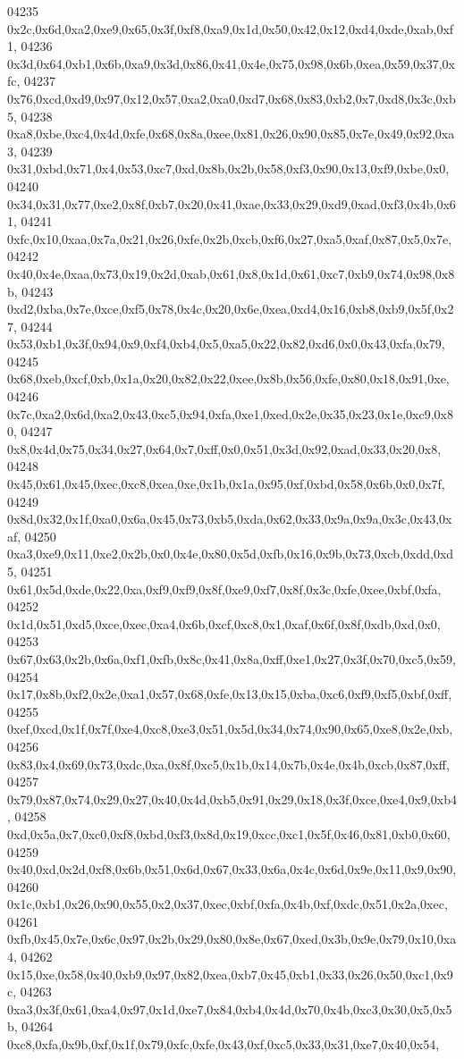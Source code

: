 \begin{DoxyCode}
04235   0x2c,0x6d,0xa2,0xe9,0x65,0x3f,0xf8,0xa9,0x1d,0x50,0x42,0x12,0xd4,0xde,0xab,0xf1,
04236   0x3d,0x64,0xb1,0x6b,0xa9,0x3d,0x86,0x41,0x4e,0x75,0x98,0x6b,0xea,0x59,0x37,0xfc,
04237   0x76,0xcd,0xd9,0x97,0x12,0x57,0xa2,0xa0,0xd7,0x68,0x83,0xb2,0x7,0xd8,0x3c,0xb5,
04238   0xa8,0xbe,0xc4,0x4d,0xfe,0x68,0x8a,0xee,0x81,0x26,0x90,0x85,0x7e,0x49,0x92,0xa3,
04239   0x31,0xbd,0x71,0x4,0x53,0xc7,0xd,0x8b,0x2b,0x58,0xf3,0x90,0x13,0xf9,0xbe,0x0,
04240   0x34,0x31,0x77,0xe2,0x8f,0xb7,0x20,0x41,0xae,0x33,0x29,0xd9,0xad,0xf3,0x4b,0x61,
04241   0xfc,0x10,0xaa,0x7a,0x21,0x26,0xfe,0x2b,0xcb,0xf6,0x27,0xa5,0xaf,0x87,0x5,0x7e,
04242   0x40,0x4e,0xaa,0x73,0x19,0x2d,0xab,0x61,0x8,0x1d,0x61,0xc7,0xb9,0x74,0x98,0x8b,
04243   0xd2,0xba,0x7e,0xce,0xf5,0x78,0x4c,0x20,0x6e,0xea,0xd4,0x16,0xb8,0xb9,0x5f,0x27,
04244   0x53,0xb1,0x3f,0x94,0x9,0xf4,0xb4,0x5,0xa5,0x22,0x82,0xd6,0x0,0x43,0xfa,0x79,
04245   0x68,0xeb,0xcf,0xb,0x1a,0x20,0x82,0x22,0xee,0x8b,0x56,0xfe,0x80,0x18,0x91,0xe,
04246   0x7c,0xa2,0x6d,0xa2,0x43,0xc5,0x94,0xfa,0xe1,0xed,0x2e,0x35,0x23,0x1e,0xc9,0x80,
04247   0x8,0x4d,0x75,0x34,0x27,0x64,0x7,0xff,0x0,0x51,0x3d,0x92,0xad,0x33,0x20,0x8,
04248   0x45,0x61,0x45,0xec,0xc8,0xea,0xe,0x1b,0x1a,0x95,0xf,0xbd,0x58,0x6b,0x0,0x7f,
04249   0x8d,0x32,0x1f,0xa0,0x6a,0x45,0x73,0xb5,0xda,0x62,0x33,0x9a,0x9a,0x3c,0x43,0xaf,
04250   0xa3,0xe9,0x11,0xe2,0x2b,0x0,0x4e,0x80,0x5d,0xfb,0x16,0x9b,0x73,0xcb,0xdd,0xd5,
04251   0x61,0x5d,0xde,0x22,0xa,0xf9,0xf9,0x8f,0xe9,0xf7,0x8f,0x3c,0xfe,0xee,0xbf,0xfa,
04252   0x1d,0x51,0xd5,0xce,0xec,0xa4,0x6b,0xcf,0xc8,0x1,0xaf,0x6f,0x8f,0xdb,0xd,0x0,
04253   0x67,0x63,0x2b,0x6a,0xf1,0xfb,0x8c,0x41,0x8a,0xff,0xe1,0x27,0x3f,0x70,0xc5,0x59,
04254   0x17,0x8b,0xf2,0x2e,0xa1,0x57,0x68,0xfe,0x13,0x15,0xba,0xc6,0xf9,0xf5,0xbf,0xff,
04255   0xef,0xcd,0x1f,0x7f,0xe4,0xc8,0xe3,0x51,0x5d,0x34,0x74,0x90,0x65,0xe8,0x2e,0xb,
04256   0x83,0x4,0x69,0x73,0xdc,0xa,0x8f,0xc5,0x1b,0x14,0x7b,0x4e,0x4b,0xcb,0x87,0xff,
04257   0x79,0x87,0x74,0x29,0x27,0x40,0x4d,0xb5,0x91,0x29,0x18,0x3f,0xce,0xe4,0x9,0xb4,
04258   0xd,0x5a,0x7,0xc0,0xf8,0xbd,0xf3,0x8d,0x19,0xcc,0xc1,0x5f,0x46,0x81,0xb0,0x60,
04259   0x40,0xd,0x2d,0xf8,0x6b,0x51,0x6d,0x67,0x33,0x6a,0x4c,0x6d,0x9e,0x11,0x9,0x90,
04260   0x1c,0xb1,0x26,0x90,0x55,0x2,0x37,0xec,0xbf,0xfa,0x4b,0xf,0xdc,0x51,0x2a,0xec,
04261   0xfb,0x45,0x7e,0x6c,0x97,0x2b,0x29,0x80,0x8e,0x67,0xed,0x3b,0x9e,0x79,0x10,0xa4,
04262   0x15,0xe,0x58,0x40,0xb9,0x97,0x82,0xea,0xb7,0x45,0xb1,0x33,0x26,0x50,0xc1,0x9c,
04263   0xa3,0x3f,0x61,0xa4,0x97,0x1d,0xe7,0x84,0xb4,0x4d,0x70,0x4b,0xc3,0x30,0x5,0x5b,
04264   0xc8,0xfa,0x9b,0xf,0x1f,0x79,0xfc,0xfe,0x43,0xf,0xc5,0x33,0x31,0xe7,0x40,0x54,

\end{DoxyCode}
